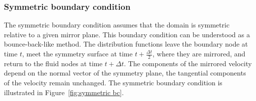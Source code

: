 \subsubsection{Symmetric boundary condition}\label{symmetric bc}
The symmetric boundary condition assumes that the domain is symmetric relative to a given mirror plane. This boundary condition can be understood as a bounce-back-like method. The distribution functions leave the boundary node at time $t$, meet the symmetry surface at time $t + \frac{\Delta t}{2}$, where they are mirrored, and return to the fluid nodes at time $t + \Delta t$. The components of the mirrored velocity depend on the normal vector of the symmetry plane, the tangential components of the velocity remain unchanged. The symmetric boundary condition is illustrated in Figure~\ref{fig:symmetric bc}.
\vspace{2mm}
